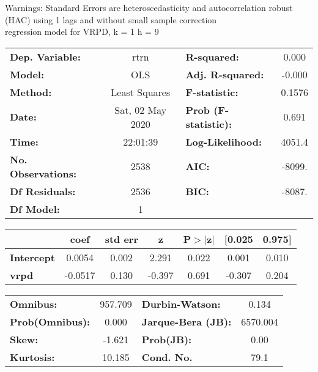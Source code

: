 Warnings: \newline
 [1] Standard Errors are heteroscedasticity and autocorrelation robust (HAC) using 1 lags and without small sample correction\\ 

regression model for VRPD, k = 1 h = 9\begin{center}
\begin{tabular}{lclc}
\toprule
\textbf{Dep. Variable:}    &       rtrn       & \textbf{  R-squared:         } &     0.000   \\
\textbf{Model:}            &       OLS        & \textbf{  Adj. R-squared:    } &    -0.000   \\
\textbf{Method:}           &  Least Squares   & \textbf{  F-statistic:       } &    0.1576   \\
\textbf{Date:}             & Sat, 02 May 2020 & \textbf{  Prob (F-statistic):} &    0.691    \\
\textbf{Time:}             &     22:01:39     & \textbf{  Log-Likelihood:    } &    4051.4   \\
\textbf{No. Observations:} &        2538      & \textbf{  AIC:               } &    -8099.   \\
\textbf{Df Residuals:}     &        2536      & \textbf{  BIC:               } &    -8087.   \\
\textbf{Df Model:}         &           1      & \textbf{                     } &             \\
\bottomrule
\end{tabular}
\begin{tabular}{lcccccc}
                   & \textbf{coef} & \textbf{std err} & \textbf{z} & \textbf{P$> |$z$|$} & \textbf{[0.025} & \textbf{0.975]}  \\
\midrule
\textbf{Intercept} &       0.0054  &        0.002     &     2.291  &         0.022        &        0.001    &        0.010     \\
\textbf{vrpd}      &      -0.0517  &        0.130     &    -0.397  &         0.691        &       -0.307    &        0.204     \\
\bottomrule
\end{tabular}
\begin{tabular}{lclc}
\textbf{Omnibus:}       & 957.709 & \textbf{  Durbin-Watson:     } &    0.134  \\
\textbf{Prob(Omnibus):} &   0.000 & \textbf{  Jarque-Bera (JB):  } & 6570.004  \\
\textbf{Skew:}          &  -1.621 & \textbf{  Prob(JB):          } &     0.00  \\
\textbf{Kurtosis:}      &  10.185 & \textbf{  Cond. No.          } &     79.1  \\
\bottomrule
\end{tabular}
\end{center}

